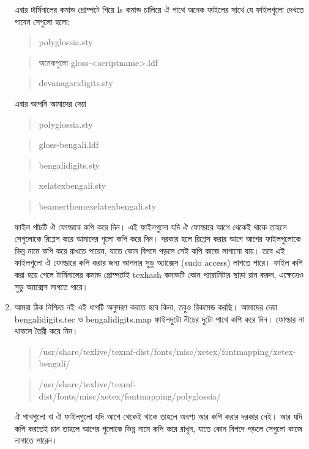 \begin{enumerate}
এবার টার্মিনালের কমান্ড প্রোম্পটে গিয়ে ls কমান্ড চালিয়ে ঐ পাথে অনেক ফাইলের সাথে যে ফাইলগুলো দেখতে পাবেন সেগুলো হলো: \begin{quote}polyglossia.sty\end{quote} \begin{quote}অনেকগুলো gloss-<scriptname>.ldf\end{quote} \begin{quote}devanagaridigits.sty\end{quote} এবার আপনি আমাদের দেয়া   
\begin{quote}polyglossia.sty\end{quote}\begin{quote}gloss-bengali.ldf\end{quote}\begin{quote}bengalidigits.sty\end{quote}\begin{quote}xelatexbengali.sty\end{quote} \begin{quote}beamerthemexelatexbengali.sty\end{quote} ফাইল পাঁচটি ঐ ফোল্ডারে কপি করে দিন। এই ফাইলগুলো যদি ঐ ফোল্ডারে আগে থেকেই থাকে তাহলে সেগুলোকে রিপ্লেস করে আমাদের গুলো কপি করে দিন। দরকার হলে রিপ্লেস করার আগে আগের ফাইলগুলোকে ভিন্ন নামে কপি করে রাখতে পারেন, যাতে কোন বিপদে পড়লে সেই কপি কাজে লাগানো যায়। তবে এই ফাইলগুলো ঐ ফোল্ডারে কপি করার জন্য আপনার সুডু অ্যাক্সেস (sudo access) লাগতে পারে। ফাইল কপি করা হয়ে গেলে টার্মিনালের কমান্ড প্রোম্পটেই texhash কমান্ডটি কোন প্যারামিটার ছাড়া রান করুন, এক্ষেত্রেও সুডু অ্যাক্সেস লাগতে পারে।

\item আমরা ঠিক নিশ্চিত নই এই ধাপটি অনুসরণ করতে হবে কিনা, তবুও রিকমেন্ড করছি। আমাদের দেয়া bengalidigits.tec ও bengalidigits.map ফাইলদুটো নীচের দুটো পাথে কপি করে দিন।  ফোল্ডার না থাকলে তৈরী করে নিন।
\begin{scriptsize}\begin{quote}‌/usr/share/texlive/texmf-dist/fonts/misc/xetex/fontmapping/xetex-bengali/\end{quote}\end{scriptsize}\begin{scriptsize}\begin{quote}/usr/share/texlive/texmf-dist/fonts/misc/xetex/fontmapping/polyglossia/\end{quote}\end{scriptsize}
ঐ পাথগুলো বা ঐ ফাইলগুলো যদি আগে থেকেই থাকে তাহলে অবশ্য আর কপি করার দরকার নেই। আর যদি কপি করতেই চান তাহলে আগের গুলোকে ভিন্ন নামে কপি করে রাখুন, যাতে কোন বিপদে পড়লে সেগুলো কাজে লাগাতে পারেন।


\end{enumerate}

